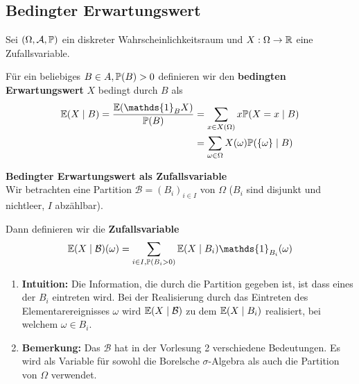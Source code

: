 \subsection{Bedingter Erwartungswert}
Sei $(\Omega, \A, \P)$ ein diskreter Wahrscheinlichkeitsraum und $X:\Omega \to \R$ eine Zufallsvariable. 

Für ein beliebiges $B \in A, \P(B) > 0$ definieren wir den \textbf{bedingten Erwartungswert} $X$ bedingt durch $B$ als
\begin{align*}
    \E(X \mid B) = \frac{\E(\mathds{1}_B X)}{\P(B)} &= \sum_{x \in X(\Omega)}x\P(X = x\mid B)\\ 
    &= \sum_{\omega \in \Omega}X(\omega)\P(\{\omega\}\mid B)
\end{align*}

\textbf{Bedingter Erwartungswert als Zufallsvariable}\\
Wir betrachten eine Partition $\mathcal{B} = (B_i)_{i \in I}$ von $\Omega$ ($B_i$ sind disjunkt und nichtleer, $I$ abzählbar). 

Dann definieren wir die \textbf{Zufallsvariable}
$$\E(X \mid \mathcal{B})(\omega) = \sum_{i \in I, \P(B_i > 0)} \E(X \mid B_i) \mathds{1}_{B_i}(\omega)$$ 
\begin{enumerate}
    \item \textbf{Intuition:} Die Information, die durch die Partition gegeben ist, ist dass eines der $B_i$ eintreten wird. Bei der Realisierung durch das Eintreten des Elementarereignisses $\omega$ wird $\E(X \mid \mathcal{B})$ zu dem $\E(X \mid B_i)$ realisiert, bei welchem $\omega \in B_i$.
    \item \textbf{Bemerkung:} Das $\mathcal{B}$ hat in der Vorlesung 2 verschiedene Bedeutungen. Es wird als Variable für sowohl die Borelsche $\sigma$-Algebra als auch die Partition von $\Omega$ verwendet.
\end{enumerate}

